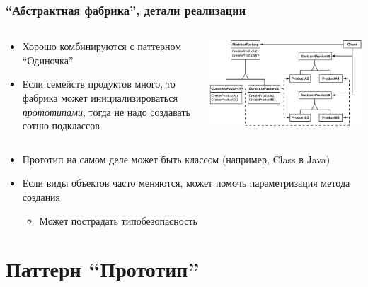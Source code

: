 \documentclass[xetex,mathserif,serif]{beamer}
\begin{document}
	\begin{frame}
		\frametitle{``Абстрактная фабрика'', детали реализации}
		\begin{columns}
			\begin{column}{0.5\textwidth}
				\begin{itemize}
					\item Хорошо комбинируются с паттерном ``Одиночка''
					\item Если семейств продуктов много, то фабрика может инициализироваться \textit{прототипами}, тогда не надо создавать сотню подклассов
				\end{itemize}
			\end{column}
			\begin{column}{0.5\textwidth}
				\begin{center}
					\includegraphics[width=\textwidth]{abstractFactory.png}
				\end{center}
			\end{column}
		\end{columns}
		\begin{itemize}
			\item Прототип на самом деле может быть классом (например, Class в Java)
			\item Если виды объектов часто меняются, может помочь параметризация метода создания
			\begin{itemize}
				\item Может пострадать типобезопасность
			\end{itemize}
		\end{itemize}
	\end{frame}

	\section{Паттерн ``Прототип''}
\end{document}
